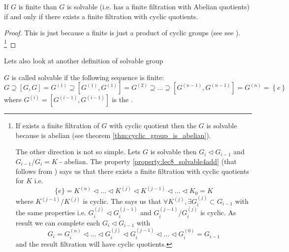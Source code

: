 \begin{property}
  If $G$ is finite than $G$ is solvable (i.e. has a finite filtration with
  Abelian quotients) if and only if there exists a
  finite filtration with cyclic quotients.
  \label{property:lec8_solvable4}
  \begin{proof}
    This is just because a finite  is just a
    product of cyclic groups (see see ).
    \footnote{
       If exists a finite filtration of $G$ with cyclic quotient then
      the $G$ is solvable because  is
      abelian (see theorem \ref{thm:cyclic_group_is_abelian}).

      The other direction is not so simple. Lets $G$ is solvable then
      $G_i \triangleleft G_{i - 1}$ and $G_{i-1} / G_{i} = K$ -
      abelian. The property \ref{property:lec8_solvable4add} (that
      follows from ) says us that there exists a
      finite filtration with cyclic quotients for $K$ i.e.
      \[
      \{e\} = K^{(n)} \triangleleft \dots \triangleleft
      K^{(j)} \triangleleft K^{(j - 1)} \triangleleft \dots \triangleleft
      K_0 = K
      \]
      where $K^{(j-1)}/K^{(j)}$ is cyclic. The 
      says us that $\forall K^{(j)}, \exists G_{i}^{(j)} \subset G_{i-1}$
      with the same properties i.e.
      $G_i^{(j)} \triangleleft G_i^{(j-1)}$ and
      $G_i^{(j-1)}/G_i^{(j)}$ is cyclic. As result we can complete
      each $G_i \triangleleft G_{i-1}$ with
      \[
      G_i = G_i^{(n)} \triangleleft \dots
      \triangleleft G_i^{(j)} \triangleleft G_i^{(j-1)} \triangleleft \dots
      \triangleleft G_i^{(0)} = G_{i-1}
      \]
      and the result filtration will have cyclic quotients.
    }
  \end{proof}
\end{property}

Lets also look at another definition of solvable group
\begin{definition}
  $G$ is called solvable if the following sequence is finite:
  \[
  G
  \supseteq \left[G, G\right] = G^{(1)}
  \supseteq \left[G^{(1)}, G^{(1)}\right] = G^{(2)}
  \supseteq \dots \supseteq
  \left[G^{(n-1)}, G^{(n-1)}\right] = G^{(n)} = \left\{e\right\}
  \]
  where $G^{(i)} = \left[G^{(i-1)}, G^{(i-1)}\right]$ is the
  .
  \label{def:solvablegroupadd}
\end{definition}

